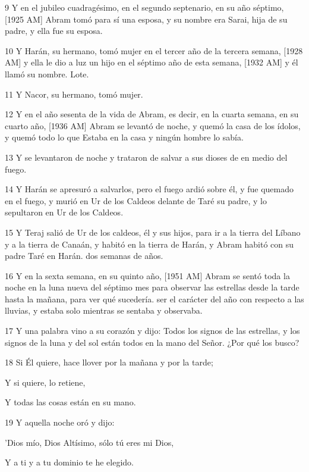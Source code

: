 \par 9 Y en el jubileo cuadragésimo, en el segundo septenario, en su año séptimo, [1925 AM] Abram tomó para sí una esposa, y su nombre era Sarai, hija de su padre, y ella fue su esposa.
\par 10 Y Harán, su hermano, tomó mujer en el tercer año de la tercera semana, [1928 AM] y ella le dio a luz un hijo en el séptimo año de esta semana, [1932 AM] y él llamó su nombre. Lote.
\par 11 Y Nacor, su hermano, tomó mujer.
\par 12 Y en el año sesenta de la vida de Abram, es decir, en la cuarta semana, en su cuarto año, [1936 AM] Abram se levantó de noche, y quemó la casa de los ídolos, y quemó todo lo que Estaba en la casa y ningún hombre lo sabía.
\par 13 Y se levantaron de noche y trataron de salvar a sus dioses de en medio del fuego.
\par 14 Y Harán se apresuró a salvarlos, pero el fuego ardió sobre él, y fue quemado en el fuego, y murió en Ur de los Caldeos delante de Taré su padre, y lo sepultaron en Ur de los Caldeos.
\par 15 Y Teraj salió de Ur de los caldeos, él y sus hijos, para ir a la tierra del Líbano y a la tierra de Canaán, y habitó en la tierra de Harán, y Abram habitó con su padre Taré en Harán. dos semanas de años.
\par 16 Y en la sexta semana, en su quinto año, [1951 AM] Abram se sentó toda la noche en la luna nueva del séptimo mes para observar las estrellas desde la tarde hasta la mañana, para ver qué sucedería. ser el carácter del año con respecto a las lluvias, y estaba solo mientras se sentaba y observaba.
\par 17 Y una palabra vino a su corazón y dijo: Todos los signos de las estrellas, y los signos de la luna y del sol están todos en la mano del Señor. ¿Por qué los busco?
\par    
\par 18 Si Él quiere, hace llover por la mañana y por la tarde;  
\par     Y si quiere, lo retiene,  
\par     Y todas las cosas están en su mano.
\par    
\par 19 Y aquella noche oró y dijo:  
\par     'Dios mío, Dios Altísimo, sólo tú eres mi Dios,  
\par     Y a ti y a tu dominio te he elegido.  
